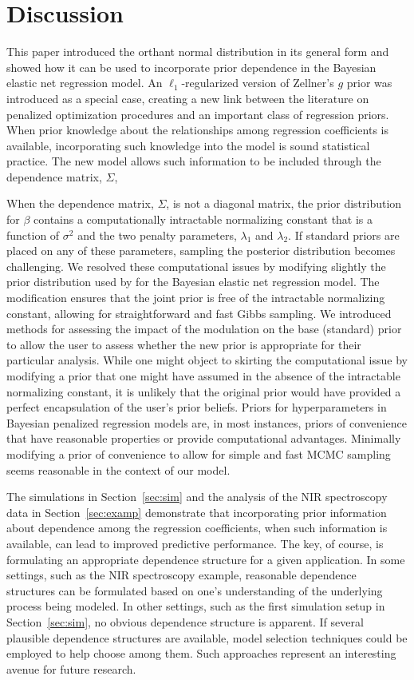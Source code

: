 \documentclass[12pt]{article}
\begin{document}
\section{Discussion}\label{sec:disc}
This paper introduced the orthant normal distribution in its general form and showed how it can 
be used to incorporate prior dependence in the Bayesian elastic net regression model.
An $\ell_1$-regularized version of Zellner's $g$ prior was introduced as a special case, creating 
a new link between the literature on penalized optimization procedures and an important class of 
regression priors. When prior knowledge about the relationships among regression coefficients is 
available, incorporating such knowledge into the model is sound statistical practice. The new
model allows such information to be included through the dependence matrix, $\Sigma$, 

When the dependence matrix, $\Sigma$, is not a diagonal matrix, the prior distribution for
$\beta$ contains a computationally intractable normalizing constant that is a function of $\sigma^2$
and the two penalty parameters, $\lambda_1$ and $\lambda_2$. If standard priors are placed on any of
these parameters, sampling the posterior distribution becomes challenging. We resolved these
computational issues by modifying slightly the prior distribution used by \citet{hans:11}
for the Bayesian elastic net regression model. The modification ensures that the joint prior
is free of the intractable normalizing constant, allowing for straightforward and fast Gibbs
sampling. We introduced methods for assessing the impact of the modulation on the base (standard)
prior to allow the user to assess whether the new prior is appropriate for their particular analysis.
While one might object to skirting the computational issue by modifying a prior that one might have
assumed in the absence of the intractable normalizing constant, it is unlikely that the original
prior would have provided a perfect encapsulation of the user's prior beliefs. Priors for 
hyperparameters in Bayesian penalized regression models are, in most instances, priors of convenience
that have reasonable properties or provide computational advantages. Minimally modifying a prior of 
convenience to allow for simple and fast MCMC sampling seems reasonable in the context of our
model.

The simulations in Section~\ref{sec:sim} and the analysis of the NIR spectroscopy data in 
Section~\ref{sec:examp} demonstrate that incorporating prior information about dependence 
among the regression coefficients, when such information is available, can lead to improved 
predictive performance. The key, of course, is formulating an appropriate dependence structure
for a given application. In some settings, such as the NIR spectroscopy example, reasonable
dependence structures can be formulated based on one's understanding of the underlying process
being modeled. In other settings, such as the first simulation setup in Section~\ref{sec:sim},
no obvious dependence structure is apparent. If several plausible dependence structures
are available, model selection techniques could be employed to help choose among them. Such 
approaches represent an interesting avenue for future research.
\end{document}
